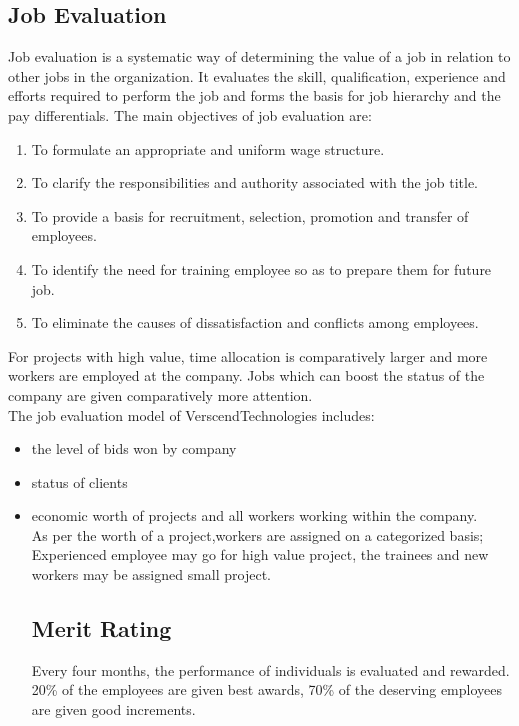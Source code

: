 \begin{itemize}
\subsection{Job Evaluation}
Job evaluation is a systematic way of determining the value of a job in relation to other jobs in the organization.
It evaluates the skill, qualification, experience and efforts required to perform the job and forms the basis for
job hierarchy and the pay differentials.
The main objectives of job evaluation are:
\begin{enumerate}
\item  To formulate an appropriate and uniform wage structure.
\item  To clarify the responsibilities and authority associated with the job title.
\item  To provide a basis for recruitment, selection, promotion and transfer of employees.
\item  To identify the need for training employee so as to prepare them for future job.
\item  To eliminate the causes of dissatisfaction and conflicts among employees.
\end{enumerate}
For projects with high value, time allocation is comparatively larger and more workers are employed at the
company. Jobs which can boost the status of the company are given comparatively more attention.\\
The job evaluation model of VerscendTechnologies includes:
\begin{itemize}
	\item the level of bids won by company
	\item status of clients 
	\item economic worth of projects and all workers working within the company.\\
As per the worth of a project,workers are assigned on a categorized basis; Experienced employee may go for high value project, the trainees
and new workers may be assigned small project.
\subsection{Merit Rating}
Every four months, the performance of individuals is evaluated and rewarded. 20\% of the employees are given
best awards, 70\% of the deserving employees are given good increments.

\end{itemize}
\end{itemize}
